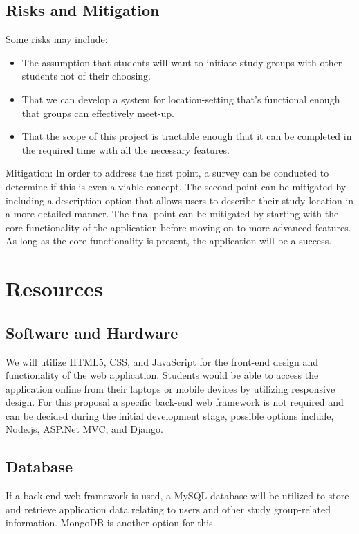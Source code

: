 \documentclass[12pt]{article}
\begin{document}
\subsection{Risks and Mitigation}
Some risks may include:
\begin{itemize}
\item The assumption that students will want to initiate study groups with other students not of their choosing.
\item That we can develop a system for location-setting that's functional enough that groups can effectively meet-up.
\item That the scope of this project is tractable enough that it can be completed in the required time with all the necessary features.
\end{itemize}
Mitigation: In order to address the first point, a survey can be conducted to determine if this is even a viable concept. The second point can be mitigated by including a description option that allows users to describe their study-location in a more detailed manner. The final point can be mitigated by starting with the core functionality of the application before moving on to more advanced features. As long as the core functionality is present, the application will be a success. 

\section{Resources}
\subsection{Software and Hardware}
We will utilize HTML5, CSS, and JavaScript for the front-end design and functionality of the web application. Students would be able to access the application online from their laptops or mobile devices by utilizing responsive design.
For this proposal a specific back-end web framework is not required and can be decided during the initial development stage, possible options include, Node.js, ASP.Net MVC, and Django.

\subsection{Database}
If a back-end web framework is used, a MySQL database will be utilized to store and retrieve application data relating to users and other study group-related information. MongoDB is another option for this.
\end{document}
